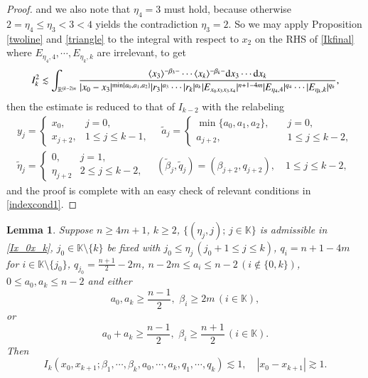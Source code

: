\documentclass[11pt,reqno]{amsart}
\def\d{{\rm d}}
\newtheorem{lemma}[theorem]{Lemma}
\numberwithin{equation}{section}
\theoremstyle{definition}
\begin{document}
\begin{proof}
	and we also note that $\eta_4=3$ must hold, because otherwise $2=\eta_4\leq\eta_3<3<4$ yields the contradiction $\eta_3=2$. So we may apply Proposition \ref{twoline} and \eqref{triangle} to the integral with respect to $x_2$ on the RHS of \eqref{Ikfinal} where $E_{\eta_4,4},\cdots,E_{\eta_k,k}$ are irrelevant, to get
	\begin{equation*}
		I_k^2\lesssim\int_{\mathbb{R}^{(k-2)n}}\frac{\langle x_3\rangle^{-\beta_3-}\cdots\langle x_k\rangle^{-\beta_k-}\d x_3\cdots \d x_k}{|x_0-x_3|^{\min\{a_0,a_1,a_2\}}|r_3|^{a_3}\cdots|r_k|^{a_k}|E_{x_0x_3x_3x_4}|^{n+1-4m}|E_{\eta_4,4}|^{q_4}\cdots|E_{\eta_k,k}|^{q_k}},
	\end{equation*}
	then the estimate is reduced to that of $I_{k-2}$ with the relabeling
	\begin{equation*}
		\begin{gathered}
			y_j=\begin{cases}
				x_0,\quad&j=0,\\
				x_{j+2},&1\leq j\leq k-1,
			\end{cases}\quad\tilde{a}_j=\begin{cases}
				\min\{a_0,a_1,a_2\},\quad&j=0,\\
				a_{j+2},&1\leq j\leq k-2,
			\end{cases}\\
			\tilde{\eta}_j=\begin{cases}
				0,\quad&j=1,\\
				\eta_{j+2}&2\leq j\leq k-2,
			\end{cases}\quad(\tilde{\beta}_j,\tilde{q}_j)=(\beta_{j+2},q_{j+2}),\quad 1\leq j\leq k-2,
		\end{gathered}
	\end{equation*}
	and the proof is complete with an easy check of relevant conditions in \eqref{indexcond1}.
\end{proof}


\begin{lemma}\label{propIkest2}
	Suppose $n\geq4m+1$, $k\geq2$, $\{(\eta_j,j);\,j\in\mathbb{K}\}$ is admissible in \eqref{Ix_0x_k}, $j_0\in\mathbb{K}\setminus\{k\}$ be fixed with $j_0\leq\eta_j\,(j_0+1\leq j\leq k)$, $q_i=n+1-4m$ for $i\in\mathbb{K}\setminus\{j_0\}$, $q_{j_0}=\frac{n+1}{2}-2m$, $n-2m\leq a_i\leq n-2\,(i\notin\{0,k\})$, $0\leq a_0,a_k\leq n-2$ and either
	\begin{equation}\label{indexcond2}
		a_0,a_k\geq\mbox{$\frac{n-1}{2}$},\,\,\beta_i\geq2m\,(i\in\mathbb{K}),
	\end{equation}
	or
	\begin{equation}\label{indexcond2'}
		a_0+a_k\geq\mbox{$\frac{n-1}{2}$},\,\,\beta_i\geq\mbox{$\frac{n+1}{2}$}\,(i\in\mathbb{K}).
	\end{equation}
	Then
	\begin{equation*}
		I_k(x_0,x_{k+1};\beta_1,\cdots,\beta_k,a_0,\cdots,a_k,q_1,\cdots,q_k)\lesssim1,\quad|x_0-x_{k+1}|\gtrsim1.
	\end{equation*}
\end{lemma}
\end{document}
